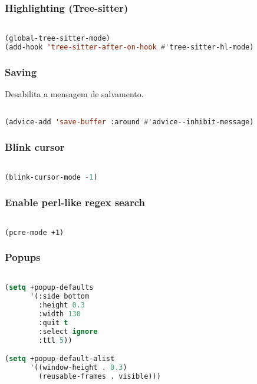 \documentclass[11pt]{article}
\begin{document}
\subsubsection{Highlighting (Tree-sitter)}
\label{sec:highlighting-tree-sitter}
\begin{lstlisting}[language=Lisp]%! Someone please complete this list for me

(global-tree-sitter-mode)
(add-hook 'tree-sitter-after-on-hook #'tree-sitter-hl-mode)
\end{lstlisting}

\subsubsection{Saving}
\label{sec:saving}
Desabilita a mensagem de salvamento.

\begin{lstlisting}[language=Lisp]%! Someone please complete this list for me

(advice-add 'save-buffer :around #'advice--inhibit-message)
\end{lstlisting}

\subsubsection{Blink cursor}
\label{sec:blink-cursor}
\begin{lstlisting}[language=Lisp]%! Someone please complete this list for me

(blink-cursor-mode -1)
\end{lstlisting}

\subsubsection{Enable perl-like regex search}
\label{sec:enable-perl-like-regex-search}
\begin{lstlisting}[language=Lisp]%! Someone please complete this list for me

(pcre-mode +1)
\end{lstlisting}

\subsubsection{Popups}
\label{sec:popups}
\begin{lstlisting}[language=Lisp]%! Someone please complete this list for me

(setq +popup-defaults
      '(:side bottom
        :height 0.3
        :width 130
        :quit t
        :select ignore
        :ttl 5))

(setq +popup-default-alist
      '((window-height . 0.3)
        (reusable-frames . visible)))
\end{lstlisting}
\end{document}
